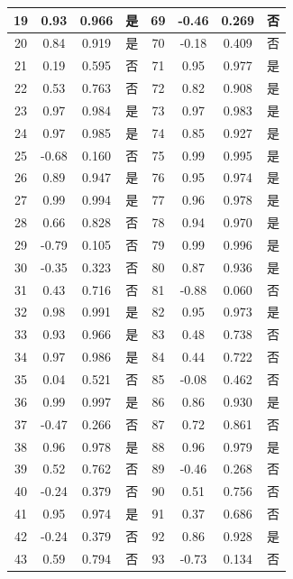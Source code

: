 \documentclass[withoutpreface]{cumcmthesis}
\begin{document}
\begin{longtable}[!htbp]{|c|c|c|c|c|c|c|c|}
        19 & 0.93 & 0.966 & 是 & 69 & -0.46 & 0.269 & 否 \\ \hline
        20 & 0.84 & 0.919 & 是 & 70 & -0.18 & 0.409 & 否 \\ \hline
        21 & 0.19 & 0.595 & 否 & 71 & 0.95 & 0.977 & 是 \\ \hline
        22 & 0.53 & 0.763 & 否 & 72 & 0.82 & 0.908 & 是 \\ \hline
        23 & 0.97 & 0.984 & 是 & 73 & 0.97 & 0.983 & 是 \\ \hline
        24 & 0.97 & 0.985 & 是 & 74 & 0.85 & 0.927 & 是 \\ \hline
        25 & -0.68 & 0.160 & 否 & 75 & 0.99 & 0.995 & 是 \\ \hline
        26 & 0.89 & 0.947 & 是 & 76 & 0.95 & 0.974 & 是 \\ \hline
        27 & 0.99 & 0.994 & 是 & 77 & 0.96 & 0.978 & 是 \\ \hline
        28 & 0.66 & 0.828 & 否 & 78 & 0.94 & 0.970 & 是 \\ \hline
        29 & -0.79 & 0.105 & 否 & 79 & 0.99 & 0.996 & 是 \\ \hline
        30 & -0.35 & 0.323 & 否 & 80 & 0.87 & 0.936 & 是 \\ \hline
        31 & 0.43 & 0.716 & 否 & 81 & -0.88 & 0.060 & 否 \\ \hline
        32 & 0.98 & 0.991 & 是 & 82 & 0.95 & 0.973 & 是 \\ \hline
        33 & 0.93 & 0.966 & 是 & 83 & 0.48 & 0.738 & 否 \\ \hline
        34 & 0.97 & 0.986 & 是 & 84 & 0.44 & 0.722 & 否 \\ \hline 
        35 & 0.04 & 0.521 & 否 & 85 & -0.08 & 0.462 & 否 \\ \hline
        36 & 0.99 & 0.997 & 是 & 86 & 0.86 & 0.930 & 是 \\ \hline
        37 & -0.47 & 0.266 & 否 & 87 & 0.72 & 0.861 & 否 \\ \hline
        38 & 0.96 & 0.978 & 是 & 88 & 0.96 & 0.979 & 是 \\ \hline
        39 & 0.52 & 0.762 & 否 & 89 & -0.46 & 0.268 & 否 \\ \hline
        40 & -0.24 & 0.379 & 否 & 90 & 0.51 & 0.756 & 否 \\ \hline
        41 & 0.95 & 0.974 & 是 & 91 & 0.37 & 0.686 & 否 \\ \hline
        42 & -0.24 & 0.379 & 否 & 92 & 0.86 & 0.928 & 是 \\ \hline
        43 & 0.59 & 0.794 & 否 & 93 & -0.73 & 0.134 & 否 \\ \hline

\end{longtable}
\end{document}
